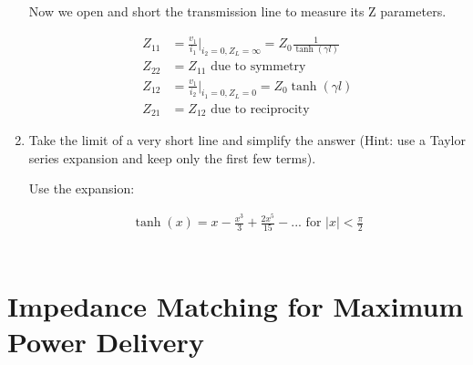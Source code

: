 \documentclass[11pt]{article}
\begin{document}
\begin{enumerate}
	Now we open and short the transmission line to measure its Z parameters.
	
	\begin{align*}
		Z_{11} &= \frac{v_1}{i_1} \bigg\rvert_{i_2 = 0, Z_L = \infty} = Z_0 \frac{1}{\tanh(\gamma l)} \\
		Z_{22} &= Z_{11} \text{ due to symmetry} \\
		Z_{12} &= \frac{v_1}{i_2} \bigg\rvert_{i_1 = 0, Z_L = 0} = Z_0 \tanh(\gamma l) \\
		Z_{21} &= Z_{12} \text{ due to reciprocity}
	\end{align*}
	
	\item Take the limit of a very short line and simplify the answer (Hint: use a Taylor series expansion and keep only the first few terms).
	
	Use the expansion:
	
	\begin{align*}
		\tanh(x) = x - \frac{x^3}{3} + \frac{2x^5}{15} - ... \text{ for } |x| < \frac{\pi}{2}
	\end{align*}
	
	\begin{align*}
		
	\end{align*}
\end{enumerate}

\section{Impedance Matching for Maximum Power Delivery}
\end{document}

